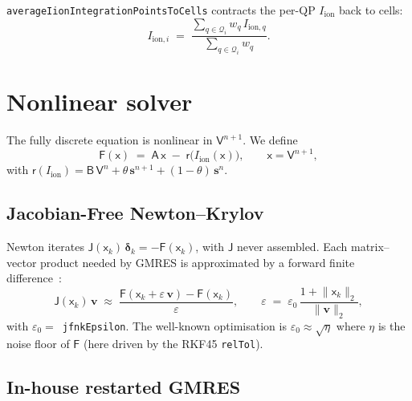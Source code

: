 \documentclass[11pt,a4paper]{article}
\newcommand{\Iion}{I_{\text{ion}}}
\newcommand{\Iionsub}[1]{I_{\text{ion},#1}}
\newcommand{\Aimp}{\mathsf{A}}
\newcommand{\Bimp}{\mathsf{B}}
\newcommand{\code}[1]{\texttt{\small #1}}
\begin{document}
\code{averageIionIntegrationPointsToCells} contracts the per-QP $\Iion$
back to cells:
\begin{equation}
  \Iionsub{i} \;=\;
   \frac{\sum_{q \in \mathcal{Q}_{i}} w_{q}\, \Iionsub{q}}
        {\sum_{q \in \mathcal{Q}_{i}} w_{q}}.
\end{equation}

\section{Nonlinear solver}

The fully discrete equation is nonlinear in $\mathsf{V}^{n+1}$. We
define
\begin{equation}
  \mathsf{F}(\mathsf{x})
   \;=\;
   \Aimp\, \mathsf{x}
   \;-\;
   \mathsf{r}\!\bigl( \Iion(\mathsf{x}) \bigr),
   \qquad
   \mathsf{x} = \mathsf{V}^{n+1},
   \label{eq:Fdef}
\end{equation}
with
$\mathsf{r}(\Iion) = \Bimp\, \mathsf{V}^{n} +
\theta\, \mathbf{s}^{n+1} + (1-\theta)\, \mathbf{s}^{n}$.

\subsection{Jacobian-Free Newton--Krylov}

Newton iterates $\mathsf{J}(\mathsf{x}_{k})\,\boldsymbol{\delta}_{k} =
-\mathsf{F}(\mathsf{x}_{k})$, with $\mathsf{J}$ never assembled.
Each matrix--vector product needed by GMRES is approximated by a
forward finite difference~\cite{knoll2004}:
\begin{equation}
  \mathsf{J}(\mathsf{x}_{k})\, \mathbf{v}
   \;\approx\;
   \frac{\mathsf{F}(\mathsf{x}_{k} + \varepsilon\, \mathbf{v})
         - \mathsf{F}(\mathsf{x}_{k})}{\varepsilon},
   \qquad
   \varepsilon \;=\; \varepsilon_{0}\,
                     \frac{1 + \lVert \mathsf{x}_{k} \rVert_{2}}
                          {\lVert \mathbf{v} \rVert_{2}},
   \label{eq:fdjac}
\end{equation}
with $\varepsilon_{0} = $~\code{jfnkEpsilon}. The well-known
optimisation is $\varepsilon_{0} \approx \sqrt{\eta}$ where $\eta$ is
the noise floor of $\mathsf{F}$ (here driven by the RKF45 \code{relTol}).

\subsection{In-house restarted GMRES}
\end{document}
